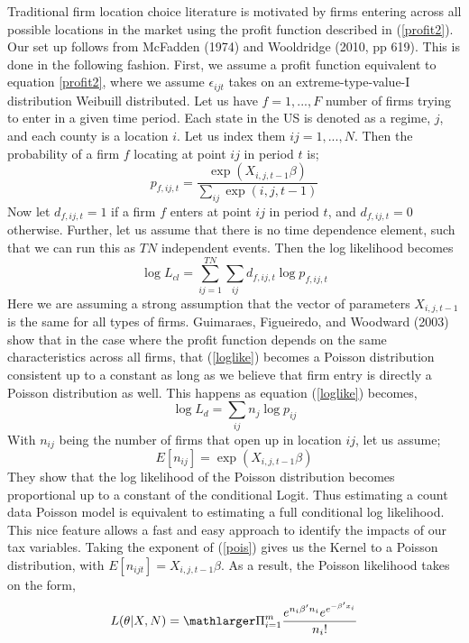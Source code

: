 Traditional firm location choice literature is motivated by firms entering across all possible locations in the market using the profit function described in (\ref{profit2}). Our set up follows from McFadden (1974) and Wooldridge (2010, pp 619). This is done in the following fashion. First, we assume a profit function equivalent to equation \ref{profit2}, where we assume $\epsilon_{ijt}$ takes on an extreme-type-value-I distribution Weibuill distributed. Let us have $f = 1,...,F$ number of firms trying to enter in a given time period. Each state in the US is denoted as a regime, $j$, and each county is a location $i$.  Let us index them $ij = 1,...,N$. Then the probability of a firm $f$ locating at point $ij$ in period $t$ is;
\begin{equation}\label{condlogit}
p_{f,ij,t} = \frac{\exp(X_{i,j,t-1}\beta)}{\sum_{ij}\exp(i,j,t-1)}
\end{equation}
Now let $d_{f,ij,t} = 1$ if a firm $f$ enters at point $ij$ in period $t$, and $d_{f,ij,t} = 0$ otherwise. Further, let us assume that there is no time dependence element, such that we can run this as $TN$ independent events. Then the log likelihood becomes
\begin{equation}\label{loglike}
\log L_{cl} = \sum_{ij=1}^{TN}\sum_{ij}d_{f,ij,t}\log p_{f,ij,t}
\end{equation}
Here we are assuming a strong assumption that the vector of parameters $X_{i,j,t-1}$ is the same for all types of firms. Guimaraes, Figueiredo, and Woodward (2003) show that in the case where the profit function depends on the same characteristics across all firms, that (\ref{loglike}) becomes a Poisson distribution consistent up to a constant as long as we believe that firm entry is directly a Poisson distribution as well. This happens as equation (\ref{loglike}) becomes,
\begin{equation}
\log L_{d} = \sum_{ij}n_{j}\log p_{ij}
\end{equation}
With $n_{ij}$ being the number of firms that open up in location $ij$, let us assume;
\begin{equation}\label{pois}
E[n_{ij}] = \exp(X_{i,j,t-1}\beta)
\end{equation}
They show that the log likelihood of the Poisson distribution becomes proportional up to a constant of the conditional Logit. 
Thus estimating a count data Poisson model is equivalent to estimating a full conditional log likelihood. This nice feature allows a fast and easy approach to identify the impacts of our tax variables.  Taking the exponent of (\ref{pois}) gives us the Kernel to a Poisson distribution, with $E[n_{ijt}] = X_{i,j,t-1}\beta$. As a result, the Poisson likelihood takes on the form,
\begin{equation}
L(\theta|X,N) = \mathlarger \Pi_{i=1}^{m}\frac{e^{n_{i}\beta'n_{i}}e^{e^{-\beta'x_{i}}}}{n_{i}!}
\end{equation}

